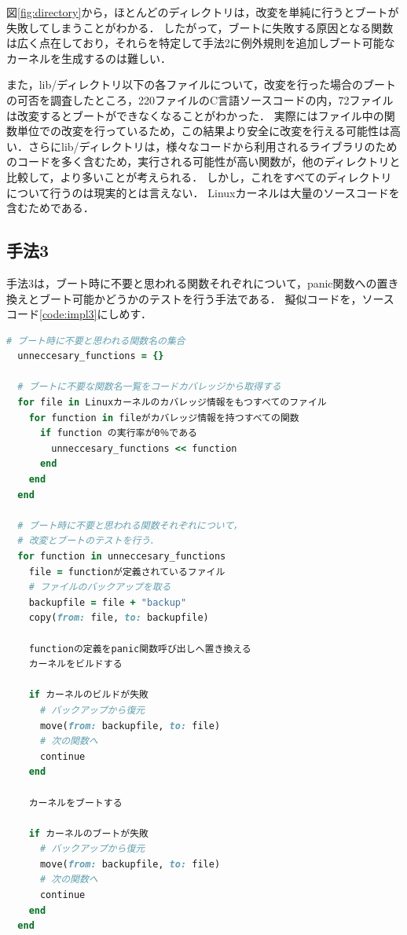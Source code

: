 \documentclass[graduation-thesis]{mlarticle}
\begin{document}
図\ref{fig:directory}から，ほとんどのディレクトリは，改変を単純に行うとブートが失敗してしまうことがわかる．
したがって，ブートに失敗する原因となる関数は広く点在しており，それらを特定して手法2に例外規則を追加しブート可能なカーネルを生成するのは難しい．

また，lib/ディレクトリ以下の各ファイルについて，改変を行った場合のブートの可否を調査したところ，220ファイルのC言語ソースコードの内，72ファイルは改変するとブートができなくなることがわかった．
実際にはファイル中の関数単位での改変を行っているため，この結果より安全に改変を行える可能性は高い．さらにlib/ディレクトリは，様々なコードから利用されるライブラリのためのコードを多く含むため，実行される可能性が高い関数が，他のディレクトリと比較して，より多いことが考えられる．
しかし，これをすべてのディレクトリについて行うのは現実的とは言えない．
Linuxカーネルは大量のソースコードを含むためである．


\subsection{手法3}
\label{implementation:3}
手法3は，ブート時に不要と思われる関数それぞれについて，panic関数への置き換えとブート可能かどうかのテストを行う手法である．
擬似コードを，ソースコード\ref{code:impl3}にしめす．

\begin{lstlisting}[language=ruby, caption=手法3の擬似コード, label=code:impl3]
  # ブート時に不要と思われる関数名の集合
  unneccesary_functions = {}

  # ブートに不要な関数名一覧をコードカバレッジから取得する
  for file in Linuxカーネルのカバレッジ情報をもつすべてのファイル
    for function in fileがカバレッジ情報を持つすべての関数
      if function の実行率が0％である
        unneccesary_functions << function
      end
    end
  end

  # ブート時に不要と思われる関数それぞれについて，
  # 改変とブートのテストを行う．
  for function in unneccesary_functions
    file = functionが定義されているファイル
    # ファイルのバックアップを取る
    backupfile = file + "backup"
    copy(from: file, to: backupfile)

    functionの定義をpanic関数呼び出しへ置き換える
    カーネルをビルドする

    if カーネルのビルドが失敗
      # バックアップから復元
      move(from: backupfile, to: file)
      # 次の関数へ
      continue
    end

    カーネルをブートする

    if カーネルのブートが失敗
      # バックアップから復元
      move(from: backupfile, to: file)
      # 次の関数へ
      continue
    end
  end
\end{lstlisting}
\end{document}
